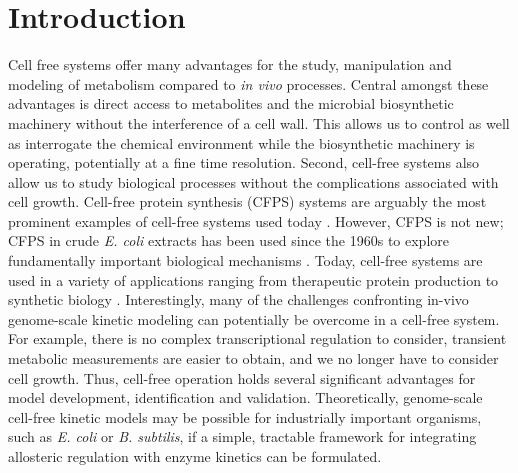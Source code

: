 \documentclass[journal=asbcd6,manuscript=article]{achemso}
\begin{document}
\section{Introduction}
Cell free systems offer many advantages for the study, manipulation and modeling of metabolism compared to \textit{in vivo} processes.
Central amongst these advantages is direct access to metabolites and the microbial biosynthetic machinery without the interference of a cell wall.
This allows us to control as well as interrogate the chemical environment while the biosynthetic machinery is operating, potentially at a fine time resolution.
Second, cell-free systems also allow us to study biological processes without the complications associated with cell growth.
Cell-free protein synthesis (CFPS) systems are arguably the most prominent examples of cell-free systems used today \cite{Jewett:2008aa}.
However, CFPS is not new; CFPS in crude \textit{E. coli} extracts has been used since the 1960s to explore fundamentally important biological mechanisms \cite{MATTHAEI:1961aa,NIRENBERG:1961aa}.
Today, cell-free systems are used in a variety of applications ranging from therapeutic protein production \cite{Lu:2014aa} to synthetic biology \cite{Hodgman:2012aa}.
Interestingly, many of the challenges confronting in-vivo genome-scale kinetic modeling can potentially be overcome in a cell-free system.
For example, there is no complex transcriptional regulation to consider, transient metabolic measurements are easier to obtain, and we no longer have to consider cell growth.
Thus, cell-free operation holds several significant advantages for model development, identification and validation.
Theoretically, genome-scale cell-free kinetic models may be possible for industrially important organisms, such as \textit{E. coli} or \textit{B. subtilis}, if a simple, tractable framework for integrating allosteric regulation with enzyme kinetics can be formulated.
\end{document}
